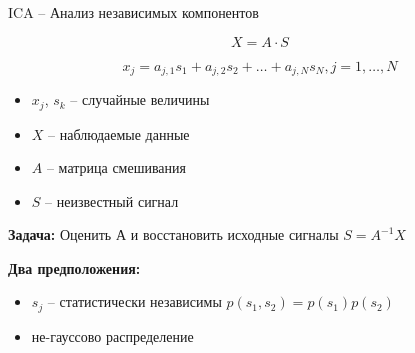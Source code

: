 \documentclass[pdf, intlimits, 9pt, unicode]{beamer}
\begin{document}
\begin{frame}{ICA -- Анализ независимых компонентов}

$$X = A \cdot S$$

$$x_j = a_{j,1} s_1 + a_{j,2} s_2 + \dots + a_{j,N} s_N, j = 1, \dots, N$$

\begin{itemize}
\item $x_j$, $s_k$ -- случайные величины
\item $X$ -- наблюдаемые данные
\item $A$ -- матрица смешивания
\item {\color{red}$S$ -- неизвестный сигнал}
\end{itemize}\pause

\textbf{Задача:} Оценить $А$ и {\color{red}восстановить исходные сигналы} $S = A^{-1}X$\pause

\textbf{Два предположения:}

\begin{itemize}
\item $s_j$ -- статистически независимы $p(s_1,s_2) = p(s_1)p(s_2)$
\item не-гауссово распределение
\end{itemize}

\end{frame}
\end{document}
